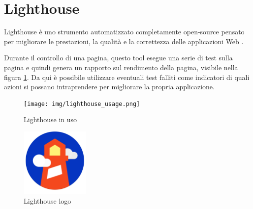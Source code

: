 \section{Lighthouse}
Lighthouse è uno strumento automatizzato completamente open-source pensato per migliorare le prestazioni, la qualità e la correttezza delle applicazioni Web \cite{githubLighthouse}.

Durante il controllo di una pagina, questo tool esegue una serie di test sulla pagina e quindi genera un rapporto sul rendimento della pagina, visibile nella figura \ref{fig:lighthouseReport}. Da qui è possibile utilizzare eventuali test falliti come indicatori di quali azioni si possano intraprendere per migliorare la propria applicazione.

\begin{figure}[H]
\centering
\texttt{[image: img/lighthouse\_usage.png]}
\caption{Lighthouse in uso}
\label{fig:lighthouseReport}
\end{figure}

\begin{figure}[H]
\centering
\includegraphics[width=0.3\textwidth]{img/logos/lighthouse_logo.png}
\caption{Lighthouse logo}
\label{fig:lighthouseLogo}
\end{figure}
